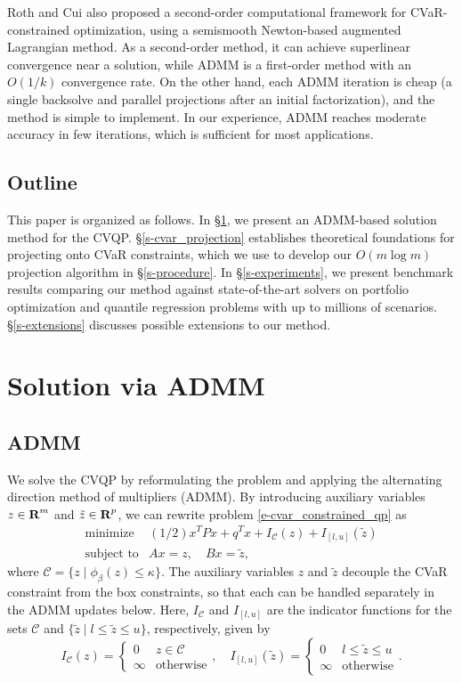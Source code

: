 \documentclass[12pt]{article}
\begin{document}
Roth and Cui \cite{roth2024fast} also proposed a second-order computational
framework for CVaR-constrained optimization, using a semismooth Newton-based
augmented Lagrangian method. As a second-order method, it can achieve superlinear convergence near a
solution, while ADMM is a first-order method with an $O(1/k)$ convergence
rate. On the other hand, each ADMM
iteration is cheap (a single backsolve and parallel projections after an
initial factorization), and the method is simple to implement. In our
experience, ADMM reaches moderate accuracy in few iterations, which is
sufficient for most applications.

\subsection{Outline}
This paper is organized as follows. In \S\ref{s-admm}, we present an ADMM-based
solution method for the CVQP. \S\ref{s-cvar_projection} establishes theoretical
foundations for projecting onto CVaR constraints, which we use to develop our
$O(m\log m)$ projection algorithm in \S\ref{s-procedure}. In
\S\ref{s-experiments}, we present benchmark results comparing our method against
state-of-the-art solvers on portfolio optimization and quantile regression
problems with up to millions of scenarios. \S\ref{s-extensions} discusses
possible extensions to our method.

\section{Solution via ADMM}
\label{s-admm}

\subsection{ADMM}
We solve the CVQP by reformulating the problem
and applying the alternating direction method of multipliers (ADMM).
By introducing auxiliary variables $z \in {\mbox{\bf R}}^m$ and
$\tilde{z} \in {\mbox{\bf R}}^p$, we can rewrite problem
\eqref{e-cvar_constrained_qp} as
\[
\begin{array}{ll}
\mbox{minimize} & (1/2)x^T Px + q^T x + I_{\mathcal{C}}(z) + I_{[l,u]}(\tilde{z}) \\
\mbox{subject to} & Ax = z,\quad Bx = \tilde{z},
\end{array}
\]
where $\mathcal{C} = \{z \mid \phi_\beta(z) \leq \kappa\}$.
The auxiliary variables $z$ and $\tilde z$ decouple the CVaR constraint
from the box constraints, so that each can be handled separately
in the ADMM updates below.
Here, $I_{\mathcal{C}}$ and $I_{[l,u]}$ are the indicator functions for the sets
$\mathcal{C}$ and $\{\tilde z \mid l \leq \tilde z \leq u\}$, respectively, given by 
\[
    I_{\mathcal{C}}(z) = \begin{cases} 0 & z\in\mathcal{C} \\ \infty & \text{otherwise} \end{cases}, 
    \quad I_{[l,u]}(\tilde{z}) = \begin{cases} 0 & l\leq \tilde z \leq u\\ \infty & \text{otherwise} \end{cases}.
\]
\end{document}
